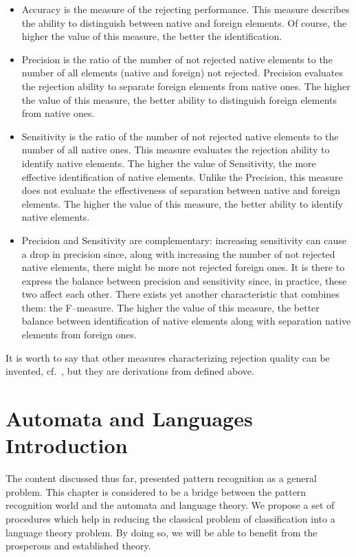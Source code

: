 \documentclass{mini}
\begin{document}
\begin{itemize}
  \item Accuracy is the measure of the rejecting performance. This measure describes the ability to distinguish between native and foreign elements. Of course, the higher the value of this measure, the better the identification.
  \item Precision is the ratio of the number of not rejected native elements to the number of all elements (native and foreign) not rejected. Precision evaluates the rejection ability to separate foreign elements from native ones. The higher the value of this measure, the better ability to distinguish foreign elements from native ones.
  \item Sensitivity is the ratio of the number of not rejected native elements to the number of all native ones. This measure evaluates the rejection ability to identify native elements. The higher the value of Sensitivity, the more effective identification of native elements. Unlike the Precision, this measure does not evaluate the effectiveness of separation between native and foreign elements. The higher the value of this measure, the better ability to identify native elements.
  \item Precision and Sensitivity are complementary: increasing sensitivity can cause a drop in precision since, along with increasing the number of not rejected native elements, there might be more not rejected foreign ones. It is there to express the balance between precision and sensitivity since, in practice, these two affect each other. There exists yet another characteristic that combines them: the \mbox{F--measure}. The higher the value of this measure, the better balance between identification of native elements along with separation native elements from foreign ones.
\end{itemize}
It is worth to say that other measures characterizing rejection quality can be invented, cf.~\cite{Homenda_2014}, but they are derivations from defined above.  

\chapter{Automata and Languages Introduction} \label{chap:lan_theory}

The content discussed thus far, presented pattern recognition as a general problem. This chapter is considered to be a bridge between the pattern recognition world and the automata and language theory. We propose a set of procedures which help in reducing the classical problem of classification into a language theory problem. By doing so, we will be able to benefit from the prosperous and established theory.
\end{document}

